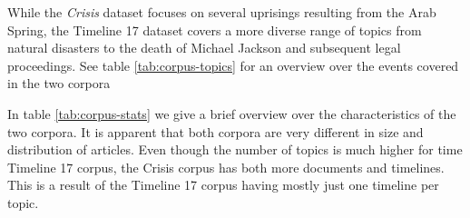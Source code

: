\documentclass[a4paper,BCOR=10mm]{report}
\numberwithin{lemma}{chapter}
\numberwithin{definition}{chapter}
\begin{document}
While the \textit{Crisis} dataset focuses on several uprisings resulting from the Arab Spring, the Timeline 17 dataset covers a more diverse range of topics from natural disasters to the death of Michael Jackson and subsequent legal proceedings. See table \ref{tab:corpus-topics} for an overview over the events covered in the two corpora

In table \ref{tab:corpus-stats} we give a brief overview over the characteristics of the two corpora. It is apparent that both corpora are very different in size and distribution of articles. Even though the number of topics is much higher for time Timeline 17 corpus, the Crisis corpus has both more documents and timelines. This is a result of the Timeline 17 corpus having mostly just one timeline per topic.

\begin{table}
\begin{centering}

\end{centering}

\caption{Corpus Statistics for our evaluation corpora}
\label{tab:corpus-stats}
\end{table}

\begin{table}
\begin{centering}
\end{centering}

\caption{Topics of our evaluation corpora}
\label{tab:corpus-topics}
\end{table}
\end{document}
